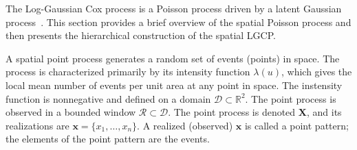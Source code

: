 \documentclass[]{interact}
\begin{document}










The Log-Gaussian Cox process is a Poisson process driven by a latent Gaussian
process~\cite{moelleretal}. This section provides a brief overview of the
spatial Poisson process and then presents the hierarchical construction of the
spatial LGCP.

A spatial point process generates a random set of events (points) in space.
The process is characterized primarily by its intensity function
\(\lambda(u)\), which gives the local mean number of events per unit area at
any point in space. The instensity function is nonnegative and defined on a
domain \(\mathcal{D} \subset \mathbb{R}^{2}\). The point process is observed
in a bounded window \(\mathcal{R} \subset \mathcal{D}\). The point process is
denoted \(\mathbf{X}\), and its realizations are \(\mathbf{x} = \{x_{1},
\dots, x_{n}\}\). A realized (observed) \(\mathbf{x}\) is called a point
pattern; the elements of the point pattern are the events.
\end{document}
